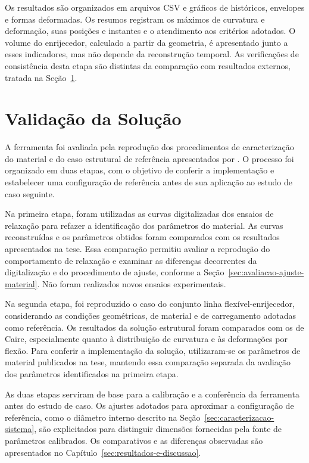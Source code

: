 \documentclass[arial,centeredequations,english,brazilian,oneside,section=TITLE]{ifes8}
\begin{document}
Os resultados são organizados em arquivos CSV e gráficos de históricos,
envelopes e formas deformadas. Os resumos registram os máximos de curvatura
e deformação, suas posições e instantes e o atendimento aos critérios
adotados. O volume do enrijecedor, calculado a partir da geometria, é apresentado
junto a esses indicadores, mas não depende da reconstrução temporal.
As verificações de consistência desta etapa são distintas da comparação
com resultados externos, tratada na Seção~\ref{sec:validacao-da-solucao}.

\section{Validação da Solução}
\label{sec:validacao-da-solucao}

A ferramenta foi avaliada pela reprodução dos procedimentos de caracterização do
material e do caso estrutural de referência apresentados por
. O processo foi organizado em duas etapas, com o objetivo
de conferir a implementação e estabelecer uma configuração de referência antes
de sua aplicação ao estudo de caso seguinte.

Na primeira etapa, foram utilizadas as curvas digitalizadas dos ensaios de
relaxação para refazer a identificação dos parâmetros do material. As curvas
reconstruídas e os parâmetros obtidos foram comparados com os resultados
apresentados na tese. Essa comparação permitiu avaliar a reprodução do
comportamento de relaxação e examinar as diferenças decorrentes da digitalização
e do procedimento de ajuste, conforme a
Seção~\ref{sec:avaliacao-ajuste-material}. Não foram realizados novos ensaios
experimentais.

Na segunda etapa, foi reproduzido o caso do conjunto linha flexível-enrijecedor,
considerando as condições geométricas, de material e de carregamento adotadas
como referência. Os resultados da solução estrutural foram comparados com os
de Caire, especialmente quanto à distribuição de curvatura e às deformações
por flexão. Para conferir a implementação da solução, utilizaram-se os
parâmetros de material publicados na tese, mantendo essa comparação separada
da avaliação dos parâmetros identificados na primeira etapa.

As duas etapas serviram de base para a calibração e a conferência da ferramenta
antes do estudo de caso. Os ajustes adotados para aproximar a configuração de
referência, como o diâmetro interno descrito na
Seção~\ref{sec:caracterizacao-sistema}, são explicitados para distinguir
dimensões fornecidas pela fonte de parâmetros calibrados. Os comparativos
e as diferenças observadas são apresentados no
Capítulo~\ref{sec:resultados-e-discussao}.
\end{document}
